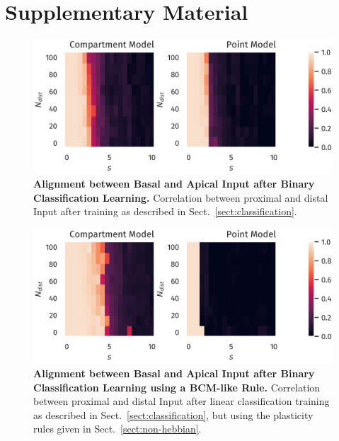 \documentclass[10pt,a4paper,twocolumn]{article}
\begin{document}
		\section{Supplementary Material}
		\begin{figure}
			\includegraphics[width=\columnwidth]{classification_correlation_dimension_scaling_high_input_dim}
			\caption{{\bf Alignment between Basal and Apical Input after Binary Classification Learning.}
				Correlation between proximal and distal Input after training as described in 
				Sect.~\ref{sect:classification}.}
			\label{fig:classification_correlation}
		\end{figure}
		
		\begin{figure}
			\includegraphics[width=\columnwidth]{classification_correlation_dimension_scaling_bcm_high_input_dim}
			\caption{{\bf Alignment between Basal and Apical Input after Binary Classification Learning
					using a BCM-like Rule.}
				Correlation between proximal and distal Input after linear classification 
				training as described in Sect.~\ref{sect:classification}, but using the plasticity
				rules given in Sect.~\ref{sect:non-hebbian}.}
			\label{fig:classification_correlation_bcm}
		\end{figure}
		
		
		
		
		
\end{document}
